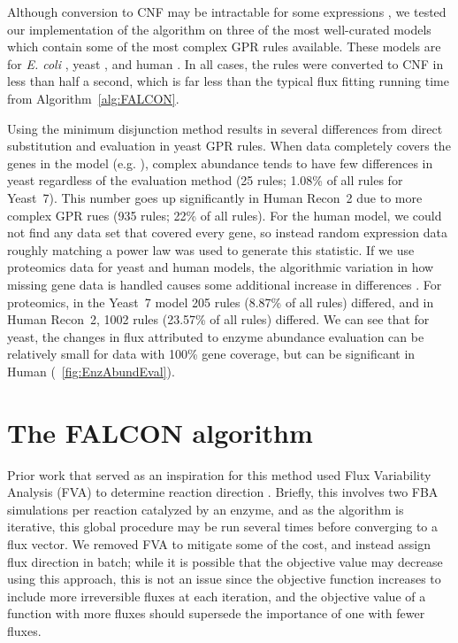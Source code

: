 Although conversion to CNF may be intractable for some expressions
\citep{Russell2009}, we tested our implementation of the algorithm on
three of the most well-curated models which contain some of the
most complex GPR rules available. These models are for \textit{E. coli}
\citep{Orth2011}, yeast \citep{Aung2013}, and human
\citep{Thiele2013}. In all cases, the rules were converted to CNF in
less than half a second, which is far less than the typical flux
fitting running time from Algorithm~\ref{alg:FALCON}.

Using the minimum disjunction method results in several
differences from direct substitution and evaluation in yeast GPR
rules. When data completely covers the genes in the model
(e.g. \citealt{Lee2012}), complex abundance tends to have few differences in yeast
regardless of the evaluation method (25 rules; 1.08\% of all rules for
Yeast~7). This number goes up significantly in Human Recon~2
\citep{Thiele2013} due to more complex GPR rues (935 rules; 22\% of
all rules). For the human model, we could not find any data set that
covered every gene, so instead random expression data roughly matching
a power law was used to generate this statistic. If we use proteomics
data for yeast and human models, the algorithmic variation in how missing gene
data is handled causes some additional increase in differences
\citep{Picotti2013,Gholami2013}.  For proteomics, in the Yeast~7 model
205 rules (8.87\% of all rules) differed, and in Human Recon~2, 1002
rules (23.57\% of all rules) differed. We can see that for yeast, the
changes in flux attributed to enzyme abundance evaluation can be
relatively small for data with 100\% gene coverage, but can be 
significant in Human (\suppOrApp \Fig~\ref{fig:EnzAbundEval}).

%
%

\section{The FALCON algorithm}
\label{sec:FALCON}

Prior work that served as an inspiration for this method used Flux
Variability Analysis (FVA) to determine reaction direction
\citep{Lee2012}. Briefly, this involves two FBA simulations per
reaction catalyzed by an enzyme, and as the algorithm is iterative,
this global procedure may be run several times before converging to a
flux vector. We removed FVA to mitigate some
of the cost, and instead assign flux direction in batch; while it is
possible that the objective value may decrease using this approach,
this is not an issue since the objective function increases to include
more irreversible fluxes at each iteration, and the objective value of
a function with more fluxes should supersede the importance of one
with fewer fluxes.

